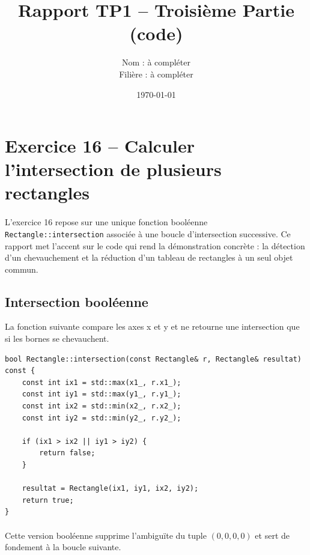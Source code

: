 \documentclass[12pt,a4paper]{article}
\title{Rapport TP1 – Troisi\`eme Partie (code)}
\author{Nom : \`a compl\'eter \\ Fili\`ere : \`a compl\'eter}
\date{\today}
\begin{document}
\maketitle
\tableofcontents
\newpage

\section{Exercice 16 – Calculer l'intersection de plusieurs rectangles}
\paragraph{}
L'exercice 16 repose sur une unique fonction bool\'eenne \texttt{Rectangle::intersection} associ\'ee \`a une boucle d'intersection successive. Ce rapport met l'accent sur le code qui rend la d\'emonstration concr\`ete : la d\'etection d'un chevauchement et la r\'eduction d'un tableau de rectangles \`a un seul objet commun.

\subsection{Intersection bool\'eenne}
La fonction suivante compare les axes x et y et ne retourne une intersection que si les bornes se chevauchent.
\begin{lstlisting}[style=cppstyle]
bool Rectangle::intersection(const Rectangle& r, Rectangle& resultat) const {
    const int ix1 = std::max(x1_, r.x1_);
    const int iy1 = std::max(y1_, r.y1_);
    const int ix2 = std::min(x2_, r.x2_);
    const int iy2 = std::min(y2_, r.y2_);

    if (ix1 > ix2 || iy1 > iy2) {
        return false;
    }

    resultat = Rectangle(ix1, iy1, ix2, iy2);
    return true;
}
\end{lstlisting}

\paragraph{}
Cette version bool\'eenne supprime l'ambigu\"ite du tuple $(0,0,0,0)$ et sert de fondement \`a la boucle suivante.
\end{document}
